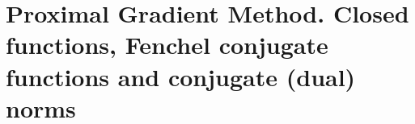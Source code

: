 \chapter{Proximal Gradient Method. Closed functions, Fenchel conjugate functions and conjugate (dual) norms}
